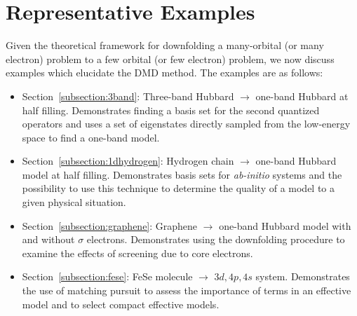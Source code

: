 \section{Representative Examples}

Given the theoretical framework for downfolding a many-orbital (or many electron) problem to a 
few orbital (or few electron) problem, we now discuss examples which elucidate the DMD method. 
The examples are as follows:
\begin{itemize}
\item Section~\ref{subsection:3band}: Three-band Hubbard $\rightarrow$ one-band Hubbard at half filling. Demonstrates finding a basis set for the second quantized operators and uses a set of eigenstates directly sampled from the low-energy space to find a one-band model.
\item Section~\ref{subsection:1dhydrogen}: Hydrogen chain $\rightarrow$ one-band Hubbard model at half filling. Demonstrates basis sets for {\it ab-initio} systems and the possibility to use this technique to determine the quality of a model to a given physical situation.
\item Section~\ref{subsection:graphene}: Graphene $\rightarrow$ one-band Hubbard model with and without $\sigma$ electrons. Demonstrates using the downfolding procedure to examine the effects of screening due to core electrons. 
\item Section~\ref{subsection:fese}: FeSe molecule $\rightarrow$ $3d,4p,4s$ system. Demonstrates the use of matching pursuit to assess the importance of terms in an effective model and to select compact effective models.
\end{itemize}


